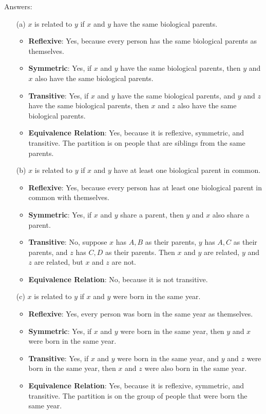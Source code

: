 \documentclass{article}
\begin{document}
Answers:
\begin{enumerate}
    \item[(a)] \( x \) is related to \( y \) if \( x \) and \( y \) have the same biological parents.
    \begin{itemize}
        \item \textbf{Reflexive}: Yes, because every person has the same biological parents as themselves.
        \item \textbf{Symmetric}: Yes, if \( x \) and \( y \) have the same biological parents, then \( y \) and \( x \) also have the same biological parents.
        \item \textbf{Transitive}: Yes, if \( x \) and \( y \) have the same biological parents, and \( y \) and \( z \) have the same biological parents, then \( x \) and \( z \) also have the same biological parents.
        \item \textbf{Equivalence Relation}: Yes, because it is reflexive, symmetric, and transitive. The partition is on people that are siblings from the same parents. 
    \end{itemize}

    \item[(b)] \( x \) is related to \( y \) if \( x \) and \( y \) have at least one biological parent in common.
    \begin{itemize}
        \item \textbf{Reflexive}: Yes, because every person has at least one biological parent in common with themselves.
        \item \textbf{Symmetric}: Yes, if \( x \) and \( y \) share a parent, then \( y \) and \( x \) also share a parent.
        \item \textbf{Transitive}: No, suppose $x$ has $A,B$ as their parents, $y$ has $A,C$ as their parents, and $z$ has $C, D$ as their parents. Then $x$ and $y$ are related, $y$ and $z$ are related, but $x$ and $z$ are not.
        \item \textbf{Equivalence Relation}: No, because it is not transitive.
    \end{itemize}

    \item[(c)] \( x \) is related to \( y \) if \( x \) and \( y \) were born in the same year.
    \begin{itemize}
        \item \textbf{Reflexive}: Yes, every person was born in the same year as themselves.
        \item \textbf{Symmetric}: Yes, if \( x \) and \( y \) were born in the same year, then \( y \) and \( x \) were born in the same year.
        \item \textbf{Transitive}: Yes, if \( x \) and \( y \) were born in the same year, and \( y \) and \( z \) were born in the same year, then \( x \) and \( z \) were also born in the same year.
        \item \textbf{Equivalence Relation}: Yes, because it is reflexive, symmetric, and transitive. The partition is on the group of people that were born the same year. 
    \end{itemize}


\end{enumerate}
\end{document}
